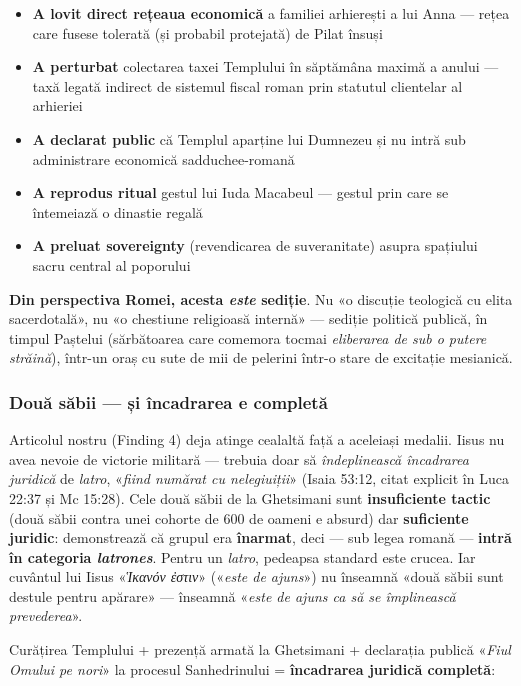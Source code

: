 \documentclass[12pt,a4paper,twoside,openany]{book}
\begin{document}
\begin{itemize}
  \item \textbf{A lovit direct rețeaua economică} a familiei arhierești a lui Anna — rețea care fusese tolerată (și probabil protejată) de Pilat însuși
  \item \textbf{A perturbat} colectarea taxei Templului în săptămâna maximă a anului — taxă legată indirect de sistemul fiscal roman prin statutul clientelar al arhieriei
  \item \textbf{A declarat public} că Templul aparține lui Dumnezeu și nu intră sub administrare economică sadduchee-romană
  \item \textbf{A reprodus ritual} gestul lui Iuda Macabeul — gestul prin care se întemeiază o dinastie regală
  \item \textbf{A preluat sovereignty} (revendicarea de suveranitate) asupra spațiului sacru central al poporului
\end{itemize}

\textbf{Din perspectiva Romei, acesta \textit{este} sediție}. Nu «o discuție teologică cu elita sacerdotală», nu «o chestiune religioasă internă» — sediție politică publică, în timpul Paștelui (sărbătoarea care comemora tocmai \textit{eliberarea de sub o putere străină}), într-un oraș cu sute de mii de pelerini într-o stare de excitație mesianică.

\subsubsection*{Două săbii — și încadrarea e completă}

Articolul nostru (Finding 4) deja atinge cealaltă față a aceleiași medalii. Iisus nu avea nevoie de victorie militară — trebuia doar să \textit{îndeplinească încadrarea juridică} de \textit{latro}, «\textit{fiind numărat cu nelegiuiții}» (Isaia 53:12, citat explicit în Luca 22:37 și Mc 15:28). Cele două săbii de la Ghetsimani sunt \textbf{insuficiente tactic} (două săbii contra unei cohorte de 600 de oameni e absurd) dar \textbf{suficiente juridic}: demonstrează că grupul era \textbf{înarmat}, deci — sub legea romană — \textbf{intră în categoria \textit{latrones}}. Pentru un \textit{latro}, pedeapsa standard este crucea. Iar cuvântul lui Iisus «\textit{Ἱκανόν ἐστιν}» («\textit{este de ajuns}») nu înseamnă «două săbii sunt destule pentru apărare» — înseamnă «\textit{este de ajuns ca să se împlinească prevederea}».

Curățirea Templului + prezență armată la Ghetsimani + declarația publică «\textit{Fiul Omului pe nori}» la procesul Sanhedrinului = \textbf{încadrarea juridică completă}:
\end{document}
